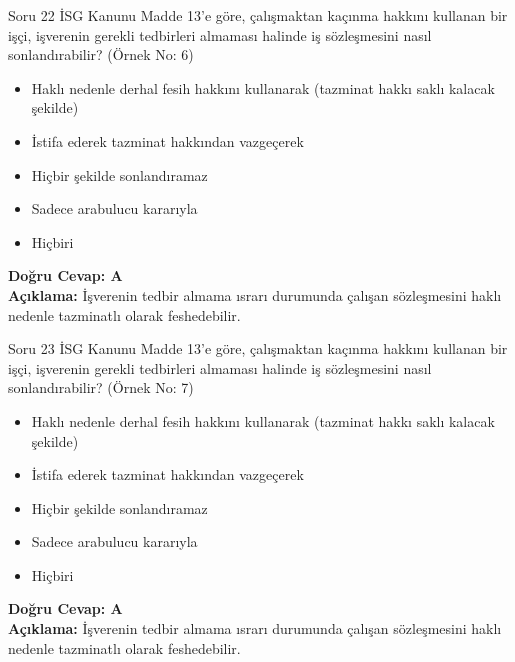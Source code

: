 \documentclass[12pt,a4paper]{article}
\begin{document}
\begin{testcard}{Soru 22}
    İSG Kanunu Madde 13'e göre, çalışmaktan kaçınma hakkını kullanan bir işçi, işverenin gerekli tedbirleri almaması halinde iş sözleşmesini nasıl sonlandırabilir? (Örnek No: 6)
    \begin{itemize}
        \item[A)] Haklı nedenle derhal fesih hakkını kullanarak (tazminat hakkı saklı kalacak şekilde)
        \item[B)] İstifa ederek tazminat hakkından vazgeçerek
        \item[C)] Hiçbir şekilde sonlandıramaz
        \item[D)] Sadece arabulucu kararıyla
        \item[E)] Hiçbiri
    \end{itemize}
    \tcblower
    \textbf{Doğru Cevap: A} \\
    \textbf{Açıklama:} İşverenin tedbir almama ısrarı durumunda çalışan sözleşmesini haklı nedenle tazminatlı olarak feshedebilir.
\end{testcard}

\begin{testcard}{Soru 23}
    İSG Kanunu Madde 13'e göre, çalışmaktan kaçınma hakkını kullanan bir işçi, işverenin gerekli tedbirleri almaması halinde iş sözleşmesini nasıl sonlandırabilir? (Örnek No: 7)
    \begin{itemize}
        \item[A)] Haklı nedenle derhal fesih hakkını kullanarak (tazminat hakkı saklı kalacak şekilde)
        \item[B)] İstifa ederek tazminat hakkından vazgeçerek
        \item[C)] Hiçbir şekilde sonlandıramaz
        \item[D)] Sadece arabulucu kararıyla
        \item[E)] Hiçbiri
    \end{itemize}
    \tcblower
    \textbf{Doğru Cevap: A} \\
    \textbf{Açıklama:} İşverenin tedbir almama ısrarı durumunda çalışan sözleşmesini haklı nedenle tazminatlı olarak feshedebilir.
\end{testcard}
\end{document}
